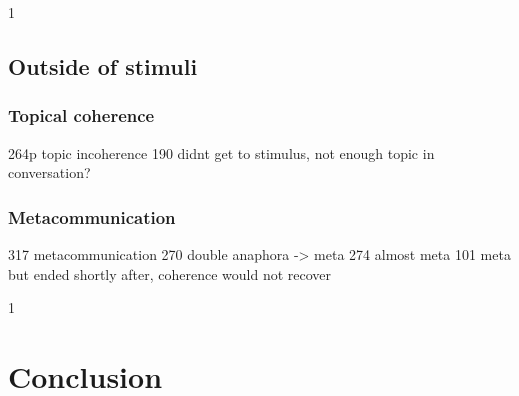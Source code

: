 1
\subsection{Outside of stimuli}

\subsubsection{Topical coherence}
    264p topic incoherence
    190 didnt get to stimulus, not enough topic in conversation?

\subsubsection{Metacommunication}
    317 metacommunication
    270 double anaphora -> meta
    274 almost meta
    101 meta but ended shortly after, coherence would not recover

1
\section{Conclusion}
